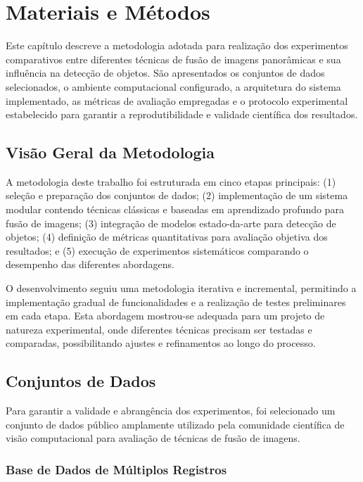 \chapter{Materiais e Métodos}

Este capítulo descreve a metodologia adotada para realização dos experimentos comparativos entre diferentes técnicas de fusão de imagens panorâmicas e sua influência na detecção de objetos. São apresentados os conjuntos de dados selecionados, o ambiente computacional configurado, a arquitetura do sistema implementado, as métricas de avaliação empregadas e o protocolo experimental estabelecido para garantir a reprodutibilidade e validade científica dos resultados.

\section{Visão Geral da Metodologia}

A metodologia deste trabalho foi estruturada em cinco etapas principais: (1) seleção e preparação dos conjuntos de dados; (2) implementação de um sistema modular contendo técnicas clássicas e baseadas em aprendizado profundo para fusão de imagens; (3) integração de modelos estado-da-arte para detecção de objetos; (4) definição de métricas quantitativas para avaliação objetiva dos resultados; e (5) execução de experimentos sistemáticos comparando o desempenho das diferentes abordagens.

O desenvolvimento seguiu uma metodologia iterativa e incremental, permitindo a implementação gradual de funcionalidades e a realização de testes preliminares em cada etapa. Esta abordagem mostrou-se adequada para um projeto de natureza experimental, onde diferentes técnicas precisam ser testadas e comparadas, possibilitando ajustes e refinamentos ao longo do processo.

\section{Conjuntos de Dados}

Para garantir a validade e abrangência dos experimentos, foi selecionado um conjunto de dados público amplamente utilizado pela comunidade científica de visão computacional para avaliação de técnicas de fusão de imagens.

\subsection{Base de Dados de Múltiplos Registros}

